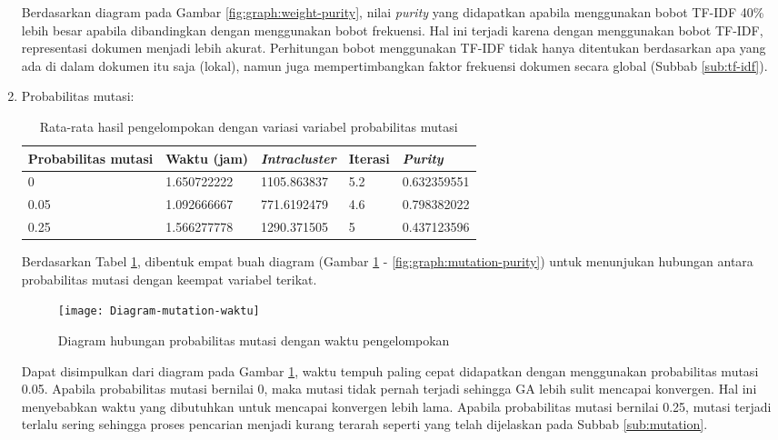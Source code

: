 \begin{enumerate}
		Berdasarkan diagram pada Gambar \ref{fig:graph:weight-purity}, nilai \textit{purity} yang didapatkan apabila menggunakan bobot TF-IDF 40\% lebih besar apabila dibandingkan dengan menggunakan bobot frekuensi. Hal ini terjadi karena dengan menggunakan bobot TF-IDF, representasi dokumen menjadi lebih akurat. Perhitungan bobot menggunakan TF-IDF tidak hanya ditentukan berdasarkan apa yang ada di dalam dokumen itu saja (lokal), namun juga mempertimbangkan faktor frekuensi dokumen secara global (Subbab \ref{sub:tf-idf}).
		
		\item Probabilitas mutasi:
		\begin{table}[H]
			\centering
			\caption{Rata-rata hasil pengelompokan dengan variasi variabel probabilitas mutasi}
			\begin{tabular}{|l|l|l|l|l|} \hline
				Probabilitas mutasi & Waktu (jam) & \textit{Intracluster} & Iterasi& \textit{Purity} \\ \hline
				0    & 1.650722222 & 1105.863837 & 5.2 & 0.632359551 \\ \hline
				0.05 & 1.092666667 & 771.6192479 & 4.6 & 0.798382022 \\ \hline
				0.25 & 1.566277778 & 1290.371505 & 5   & 0.437123596 \\ \hline
			\end{tabular}
			\label{tbl:exp-mutation}
		\end{table}
		
		Berdasarkan Tabel \ref{tbl:exp-mutation}, dibentuk empat buah diagram (Gambar \ref{fig:graph:mutation-time} - \ref{fig:graph:mutation-purity}) untuk menunjukan hubungan antara probabilitas mutasi dengan keempat variabel terikat.
		
		\begin{figure}[H]
			\centering
			\texttt{[image: Diagram-mutation-waktu]}
			\caption{Diagram hubungan probabilitas mutasi dengan waktu pengelompokan}
			\label{fig:graph:mutation-time}
		\end{figure}
		
		Dapat disimpulkan dari diagram pada Gambar \ref{fig:graph:mutation-time}, waktu tempuh paling cepat didapatkan dengan menggunakan probabilitas mutasi 0.05. Apabila probabilitas mutasi bernilai 0, maka mutasi tidak pernah terjadi sehingga GA lebih sulit mencapai konvergen. Hal ini menyebabkan waktu yang dibutuhkan untuk mencapai konvergen lebih lama. Apabila probabilitas mutasi bernilai 0.25, mutasi terjadi terlalu sering sehingga proses pencarian menjadi kurang terarah seperti yang telah dijelaskan pada Subbab \ref{sub:mutation}.
		

\end{enumerate}
